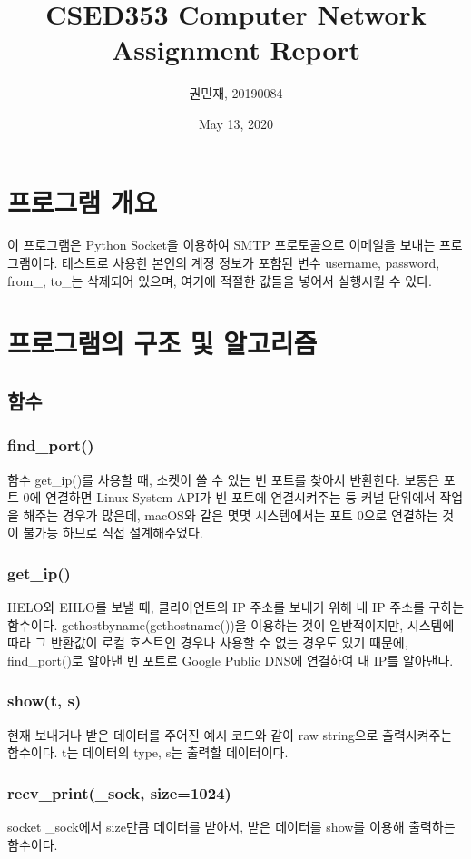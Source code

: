 \documentclass{article}
\begin{document}
    \author{권민재, 20190084}
    \title{CSED353 Computer Network Assignment Report}
    \date{May 13, 2020}
    \maketitle


    \section{프로그램 개요}
    이 프로그램은 Python Socket을 이용하여 SMTP 프로토콜으로 이메일을 보내는 프로그램이다.
    테스트로 사용한 본인의 계정 정보가 포함된 변수 username, password, from\_, to\_는 삭제되어 있으며,
    여기에 적절한 값들을 넣어서 실행시킬 수 있다.

    \section{프로그램의 구조 및 알고리즘}
    \subsection{함수}
    \subsubsection{find\_port()}
    함수 get\_ip()를 사용할 때, 소켓이 쓸 수 있는 빈 포트를 찾아서 반환한다. 보통은 포트 0에 연결하면 Linux System API가 빈 포트에 연결시켜주는 등 커널 단위에서 작업을 해주는 경우가 많은데,
    macOS와 같은 몇몇 시스템에서는 포트 0으로 연결하는 것이 불가능 하므로 직접 설계해주었다.
    \subsubsection{get\_ip()}
    HELO와 EHLO를 보낼 때, 클라이언트의 IP 주소를 보내기 위해 내 IP 주소를 구하는 함수이다.
    gethostbyname(gethostname())을 이용하는 것이 일반적이지만, 시스템에 따라 그 반환값이 로컬 호스트인 경우나 사용할 수 없는 경우도 있기 때문에,
    find\_port()로 알아낸 빈 포트로 Google Public DNS에 연결하여 내 IP를 알아낸다.
    \subsubsection{show(t, s)}
    현재 보내거나 받은 데이터를 주어진 예시 코드와 같이 raw string으로 출력시켜주는 함수이다.
    t는 데이터의 type, s는 출력할 데이터이다.
    \subsubsection{recv\_print(\_sock, size=1024)}
    socket \_sock에서 size만큼 데이터를 받아서, 받은 데이터를 show를 이용해 출력하는 함수이다.
\end{document}
